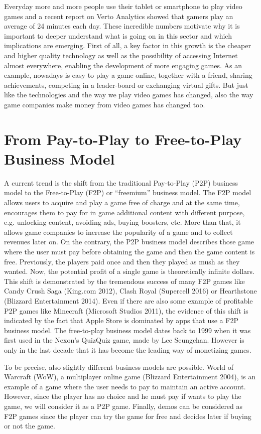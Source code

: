 Everyday more and more people use their tablet or smartphone to play video games and a recent report on Verto Analytics \cite{_report:_2016} showed that gamers play an average of 24 minutes each day. These incredible numbers motivate why it is important to deeper understand what is going on in this sector and which implications are emerging. First of all, a key factor in this growth is the cheaper and higher quality technology as well as the possibility of accessing Internet almost everywhere, enabling the development of more engaging games. As an example, nowadays is easy to play a game online, together with a friend, sharing achievements, competing in a leader-board or exchanging virtual gifts. But just like the technologies and the way we play video games has changed, also the way game companies make money from video games has changed too. 

\section{From Pay-to-Play to Free-to-Play Business Model}
A current trend is the shift from the traditional Pay-to-Play (P2P) business model to the Free-to-Play (F2P) or “freemium” business model. The F2P model allows users to acquire and play a game free of charge and at the same time, encourages them to pay for in game additional content  with different purpose, e.g. unlocking content, avoiding ads, buying boosters, etc. More than that, it allows game companies to increase the popularity of a game and to collect revenues later on. On the contrary, the P2P business model describes those game where the user must pay before obtaining the game and then the game content is free. Previously, the players paid once and then they played as mush as they wanted. Now,  the potential profit of a single game is theoretically infinite dollars. This shift is demonstrated by the tremendous success of many F2P games like Candy Crush Saga (King.com 2012), Clash Royal (Supercell 2016) or Hearthstone (Blizzard Entertainment 2014). Even if there are also some example of profitable P2P games like Minecraft (Microsoft Studios 2011), the evidence of this shift is indicated by the fact that Apple Store is dominated by apps that use a F2P business model. The free-to-play business model dates back to  1999 when it was first used in the Nexon's QuizQuiz game, made by Lee Seungchan. However is only in the last decade that it has become the leading way of monetizing games.

To be precise, also slightly different business models are possible. World of Warcraft (WoW), a multiplayer online game (Blizzard Entertainment 2004), is an example of a game where the user needs to pay to maintain an active account. However, since the player has no choice and he must pay if wants to play the game, we will consider it as a P2P game. Finally, demos can be considered as F2P games since the player can try the game for free and decides later if buying or not the game. 

